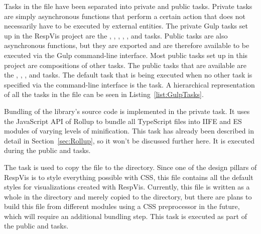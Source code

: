 Tasks in the  file have been separated into private
and public tasks.  Private tasks are simply asynchronous functions
that perform a certain action that does not necessarily have to be
executed by external entities.  The private Gulp tasks set up in the
RespVis project are the , ,
, , , and
 tasks.  Public tasks are also asynchronous
functions, but they are exported and are therefore available to be
executed via the Gulp command-line interface.  Most public tasks set
up in this project are compositions of other tasks.  The public tasks
that are available are the , ,
, and  tasks.  The default task that is being
executed when no other task is specified via the command-line
interface is the  task.  A hierarchical representation of
all the tasks in the  file can be seen in
Listing~\ref{list:GulpTasks}.

\begin{samepage}
%
    A hierarichal representation of the tasks defined in the  file.
    This presentation has been created with the  command.
  },
]{listings/gulp-tasks.txt}
\end{samepage}
  


Bundling of the library's source code is implemented in the private
 task.  It uses the JavaScript API of Rollup to bundle
all TypeScript files into IIFE and ES modules of varying levels of
minification.  This task has already been described in detail in
Section~\ref{sec:Rollup}, so it won't be discussed further here.  It
is executed during the public  and  tasks.

The  task is used to copy the 
file to the  directory.  Since one of the design pillars
of RespVis is to style everything possible with CSS, this file
contains all the default styles for visualizations created with
RespVis.  Currently, this file is written as a whole in the
 directory and merely copied to the  directory,
but there are plans to build this file from different modules using a
CSS preprocessor in the future, which will require an additional
bundling step.  This task is executed as part of the public
 and  tasks.


